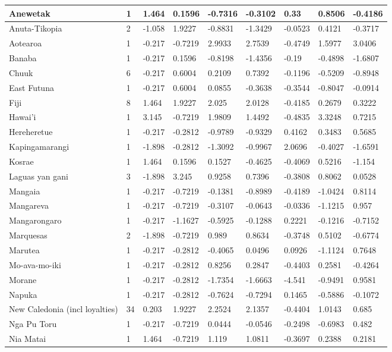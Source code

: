 \documentclass[draft,10pt]{article} %
\begin{document}
\begin{landscape}
\begin{longtable}{| p{2.6cm} |  p{1cm} | p{1.2cm}  | p{1.9cm}  | p{1.7cm}  | p{1.7cm}  | p{1.7cm}  | p{1.6cm} | p{1.5cm}   |}
\hline
Anewetak&1&1.464&0.1596&-0.7316&-0.3102&0.33&0.8506&-0.4186\\ \hline
Anuta-Tikopia&2&-1.058&1.9227&-0.8831&-1.3429&-0.0523&0.4121&-0.3717\\ \hline
Aotearoa&1&-0.217&-0.7219&2.9933&2.7539&-0.4749&1.5977&3.0406\\ \hline
Banaba&1&-0.217&0.1596&-0.8198&-1.4356&-0.19&-0.4898&-1.6807\\ \hline
Chuuk&6&-0.217&0.6004&0.2109&0.7392&-0.1196&-0.5209&-0.8948\\ \hline
East Futuna&1&-0.217&0.6004&0.0855&-0.3638&-0.3544&-0.8047&-0.0914\\ \hline
Fiji&8&1.464&1.9227&2.025&2.0128&-0.4185&0.2679&0.3222\\ \hline
Hawai'i&1&3.145&-0.7219&1.9809&1.4492&-0.4835&3.3248&0.7215\\ \hline
Hereheretue&1&-0.217&-0.2812&-0.9789&-0.9329&0.4162&0.3483&0.5685\\ \hline
Kapingamarangi&1&-1.898&-0.2812&-1.3092&-0.9967&2.0696&-0.4027&-1.6591\\ \hline
Kosrae&1&1.464&0.1596&0.1527&-0.4625&-0.4069&0.5216&-1.154\\ \hline
Laguas yan gani&3&-1.898&3.245&0.9258&0.7396&-0.3808&0.8062&0.0528\\ \hline
Mangaia&1&-0.217&-0.7219&-0.1381&-0.8989&-0.4189&-1.0424&0.8114\\ \hline
Mangareva&1&-0.217&-0.7219&-0.3107&-0.0643&-0.0336&-1.1215&0.957\\ \hline
Mangarongaro&1&-0.217&-1.1627&-0.5925&-0.1288&0.2221&-0.1216&-0.7152\\ \hline
Marquesas&2&-1.898&-0.7219&0.989&0.8634&-0.3748&0.5102&-0.6774\\ \hline
Marutea&1&-0.217&-0.2812&-0.4065&0.0496&0.0926&-1.1124&0.7648\\ \hline
Mo-ava-mo-iki&1&-0.217&-0.2812&0.8256&0.2847&-0.4403&0.2581&-0.4264\\ \hline
Morane&1&-0.217&-0.2812&-1.7354&-1.6663&-4.541&-0.9491&0.9581\\ \hline
Napuka&1&-0.217&-0.2812&-0.7624&-0.7294&0.1465&-0.5886&-0.1072\\ \hline
New Caledonia (incl loyalties)&34&0.203&1.9227&2.2524&2.1357&-0.4404&1.0143&0.685\\ \hline
Nga Pu Toru&1&-0.217&-0.7219&0.0444&-0.0546&-0.2498&-0.6983&0.482\\ \hline
Nia Matai&1&1.464&-0.7219&1.119&1.0811&-0.3697&0.2388&0.2181\\ \hline

\end{longtable}
\end{landscape}
\end{document}
